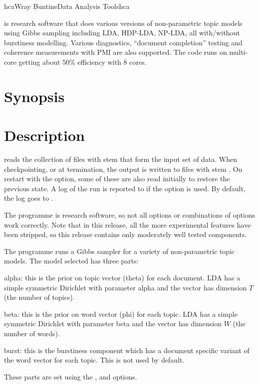 \documentclass[a4paper,english]{article}
\begin{document}
\begin{Name}{1}{hca}{Wray Buntine}{Data Analysis Tools}{hca}

   is research software
that does various versions of non-parametric topic models using Gibbs sampling including LDA, HDP-LDA, NP-LDA, all with/without burstiness modelling.  Various diagnostics, ``document completion'' testing and coherence measurements with PMI are also supported. The code
runs on multi-core getting about 50\% efficiency with 8 cores.

\end{Name}

\section{Synopsis}

  
                  

\section{Description}
 reads the collection of files with stem
 that form the input set of data.
When checkpointing, or at termination, the output is written
to files with stem  .
On restart with the  option, some of these
are also read initially to restore the previous state.
A log of the run is reported to  if the
 option is used.  By default, the log goes to
.

The programme is research software, so not all options
or combinations of options work correctly.
Note that in this release, all the more experimental features
have been stripped, so this release contains
only moderately well tested components.

The programme runs a Gibbs sampler for a variety of
non-parametric topic models.
The model selected has three parts:
\begin{Description}[alpha]
\item[alpha:] this is the prior on topic vector (theta) for each document.
LDA has a simple symmetric Dirichlet with parameter alpha
and the vector has dimension $T$ (the number of topics).
\item[beta:] this is the prior on word vector  (phi) for each topic.
LDA has a simple symmetric Dirichlet with parameter beta
and the vector has dimension $W$ (the number of words).
\item[burst:]  this is the burstiness component which has
a document specific variant of the word vector for
each topic.  This is not used by default.
\end{Description}
These parts are set using the
,  and  options.
\end{document}
